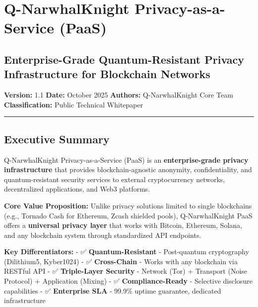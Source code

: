 \documentclass[
  11pt,
]{article}
\author{}
\date{}
\begin{document}
{
\hypersetup{linkcolor=}
\setcounter{tocdepth}{3}
\tableofcontents
}
\hypertarget{q-narwhalknight-privacy-as-a-service-paas}{%
\section{Q-NarwhalKnight Privacy-as-a-Service
(PaaS)}\label{q-narwhalknight-privacy-as-a-service-paas}}

\hypertarget{enterprise-grade-quantum-resistant-privacy-infrastructure-for-blockchain-networks}{%
\subsection{Enterprise-Grade Quantum-Resistant Privacy Infrastructure
for Blockchain
Networks}\label{enterprise-grade-quantum-resistant-privacy-infrastructure-for-blockchain-networks}}

\textbf{Version:} 1.1 \textbf{Date:} October 2025 \textbf{Authors:}
Q-NarwhalKnight Core Team \textbf{Classification:} Public Technical
Whitepaper

\begin{center}\rule{0.5\linewidth}{0.5pt}\end{center}

\hypertarget{executive-summary}{%
\subsection{Executive Summary}\label{executive-summary}}

Q-NarwhalKnight Privacy-as-a-Service (PaaS) is an
\textbf{enterprise-grade privacy infrastructure} that provides
blockchain-agnostic anonymity, confidentiality, and quantum-resistant
security services to external cryptocurrency networks, decentralized
applications, and Web3 platforms.

\textbf{Core Value Proposition:} Unlike privacy solutions limited to
single blockchains (e.g., Tornado Cash for Ethereum, Zcash shielded
pools), Q-NarwhalKnight PaaS offers a \textbf{universal privacy layer}
that works with Bitcoin, Ethereum, Solana, and any blockchain system
through standardized API endpoints.

\textbf{Key Differentiators:} - ✅ \textbf{Quantum-Resistant} -
Post-quantum cryptography (Dilithium5, Kyber1024) - ✅
\textbf{Cross-Chain} - Works with any blockchain via RESTful API - ✅
\textbf{Triple-Layer Security} - Network (Tor) + Transport (Noise
Protocol) + Application (Mixing) - ✅ \textbf{Compliance-Ready} -
Selective disclosure capabilities - ✅ \textbf{Enterprise SLA} - 99.9\%
uptime guarantee, dedicated infrastructure
\end{document}
